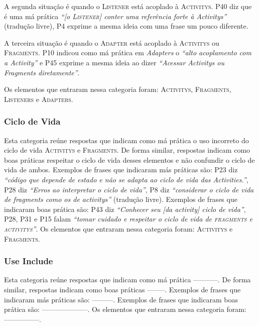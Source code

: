 A segunda situa\c{c}\~ao \'e quando o \textsc{Listener} est\'a acoplado \`a \textsc{Activitys}. P40 diz que \'e uma m\'a pr\'atica \textit{``[o \textsc{Listener}] conter uma refer\^encia forte \`a Activitys''} (tradu\c{c}\~ao livre), P4 exprime a mesma ideia com uma frase um pouco diferente. 

A terceira situa\c{c}\~ao \'e quando o \textsc{Adapter} est\'a acoplado \`a \textsc{Activitys} ou \textsc{Fragments}. P10 indicou como m\'a pr\'atica em \textit{Adapters} o \textit{``alto acoplamento com a Activity''} e P45 exprime a mesma ideia ao dizer \textit{``Acessar Activitys ou Fragments diretamente''}. 

Os elementos que entraram nessa categoria foram: \textsc{Activitys}, \textsc{Fragments}, \textsc{Listeners} e \textsc{Adapters}. 

\subsubsection{Ciclo de Vida}
Esta categoria re\'une respostas que indicam como m\'a pr\'atica o uso incorreto do ciclo de vida \textsc{Activitys} e \textsc{Fragments}. De forma similar, respostas indicam como boas pr\'aticas respeitar o ciclo de vida desses elementos e não confundir o ciclo de vida de ambos. Exemplos de frases que indicaram m\'as pr\'aticas s\~ao: P23 diz \textit{``código que depende de estado e não se adapta ao ciclo de vida das Activities.''}, P28 diz \textit{``Erros ao interpretar o ciclo de vida''}, P8 diz \textit{``considerar o ciclo de vida de fragments como os de activitys''} (tradução livre). Exemplos de frases que indicaram boas pr\'atica s\~ao: P43 diz \textit{``Conhecer seu [da activity] ciclo de vida''}, P28, P31 e P15 falam \textit{``tomar cuidado e respeitar o ciclo de vida de \textsc{fragments} e \textsc{activitys}''}. Os elementos que entraram nessa categoria foram: \textsc{Activitys} e \textsc{Fragments}. 

\subsubsection{Use Include}
Esta categoria re\'une respostas que indicam como m\'a pr\'atica -----------. De forma similar, respostas indicam como boas pr\'aticas --------. Exemplos de frases que indicaram m\'as pr\'aticas s\~ao: ---------. Exemplos de frases que indicaram boas pr\'atica s\~ao: --------------------. Os elementos que entraram nessa categoria foram: ---------------. 

